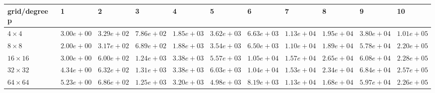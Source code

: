 \begin{tabular}{lllllllllll}
\hline
 grid/degree p   & 1          & 2          & 3          & 4          & 5          & 6          & 7          & 8          & 9          & 10         \\
\hline
 $4 \times 4$    & $3.00e+00$ & $3.29e+02$ & $7.86e+02$ & $1.85e+03$ & $3.62e+03$ & $6.63e+03$ & $1.13e+04$ & $1.95e+04$ & $3.80e+04$ & $1.01e+05$ \\
 $8 \times 8$    & $2.00e+00$ & $3.17e+02$ & $6.89e+02$ & $1.88e+03$ & $3.54e+03$ & $6.50e+03$ & $1.10e+04$ & $1.89e+04$ & $5.78e+04$ & $2.20e+05$ \\
 $16 \times 16$  & $3.00e+00$ & $6.00e+02$ & $1.24e+03$ & $3.38e+03$ & $5.57e+03$ & $1.05e+04$ & $1.57e+04$ & $2.65e+04$ & $6.08e+04$ & $2.28e+05$ \\
 $32 \times 32$  & $4.34e+00$ & $6.32e+02$ & $1.31e+03$ & $3.38e+03$ & $6.03e+03$ & $1.04e+04$ & $1.53e+04$ & $2.34e+04$ & $6.84e+04$ & $2.57e+05$ \\
 $64 \times 64$  & $5.23e+00$ & $6.86e+02$ & $1.25e+03$ & $3.20e+03$ & $4.98e+03$ & $8.19e+03$ & $1.13e+04$ & $1.68e+04$ & $5.97e+04$ & $2.26e+05$ \\
\hline
\end{tabular}
